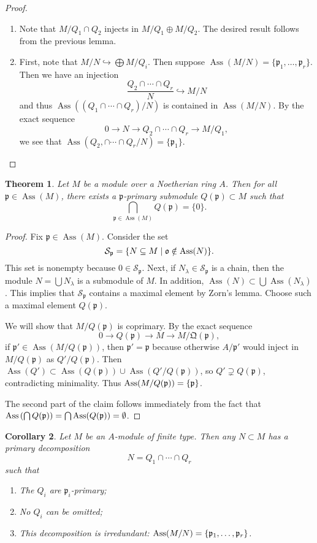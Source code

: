 \documentclass[leqno, openany]{memoir}
\newtheorem{thm}{Theorem}[section]
\newtheorem{cor}[thm]{Corollary}
\theoremstyle{definition}
\theoremstyle{remark}
\theoremstyle{plain}
\theoremstyle{definition}
\theoremstyle{remark}
\newcommand{\mc}[1]{\mathcal{#1}}
\newcommand{\mf}[1]{\mathfrak{#1}}
\DeclareMathOperator{\Ass}{Ass}
\begin{document}
\begin{proof} \begin{enumerate} \item Note that $M / Q_1 \cap Q_2$ injects in
    $M / Q_1 \oplus M / Q_2$. The desired result follows from the previous
    lemma.  \item First, note that $M/N \hookrightarrow \bigoplus M / Q_i$.
    Then suppose $\Ass(M/N) = \{ \mf{p}_1, \ldots, \mf{p}_r \}$. Then we have
    an injection \[ \frac{Q_2 \cap \cdots \cap Q_r}{N} \hookrightarrow M/N \]
    and thus $\Ass((Q_1 \cap  \cdots \cap Q_r)/N)$ is contained in $\Ass(M/N)$.
    By the exact sequence \[ 0 \to N \to Q_2 \cap \cdots \cap Q_r \to M/Q_1, \]
    we see that $\Ass(Q_2, \cap \cdots \cap Q_r / N) = \{ \mf{p}_1 \}$.
    \qedhere \end{enumerate} \end{proof}

\begin{thm} Let $M$ be a module over a Noetherian ring $A$. Then for all
    $\mf{p} \in \Ass(M)$, there exists a $\mf{p}$-primary submodule $Q(\mf{p})
    \subset M$ such that \[ \bigcap_{\mf{p} \in \Ass(M)} Q(\mf{p}) = \{0 \}. \]
\end{thm}

\begin{proof} Fix $\mf{p} \in \Ass(M)$. Consider the set \[ \mc{S}_{\mf{p}} =
\qty{ N \subseteq M \mid \mf{o} \notin \Ass(N) }. \] This set is nonempty
because $0 \in \mc{S}_{\mf{p}}$. Next, if $N_{\lambda} \in \mc{S}_{\mf{p}}$ is
a chain, then the module $N = \bigcup N_{\lambda}$ is a submodule of $M$. In
addition, $\Ass(N) \subset \bigcup \Ass(N_{\lambda})$. This implies that
$\mc{S}_{\mf{p}}$ contains a maximal element by Zorn's lemma. Choose such a
maximal element $Q(\mf{p})$.

    We will show that $M/Q(\mf{p})$ is coprimary. By the exact sequence \[ 0
    \to Q(\mf{p}) \to M \to M/\mf{Q}(\mf{p}), \] if $\mf{p}' \in
    \Ass(M/Q(\mf{p}))$, then $\mf{p}' = \mf{p}$ because otherwise $A/ \mf{p}'$
    would inject in $M / Q(\mf{p})$ as $Q'/Q(\mf{p})$. Then $\Ass(Q') \subset
    \Ass(Q(\mf{p})) \cup \Ass(Q' / Q(\mf{p}))$, so $Q' \supsetneq Q(\mf{p})$,
    contradicting minimality. Thus $\Ass(M / Q(\mf{p})) = \qty{\mf{p}}$. 

    The second part of the claim follows immediately from the fact that
$\Ass\qty(\bigcap Q(\mf{p})) = \bigcap \Ass(Q(\mf{p})) = \emptyset$.
\end{proof}

\begin{cor} Let $M$ be an $A$-module of finite type. Then any $N \subset M$ has
    a primary decomposition \[ N = Q_1 \cap \cdots \cap Q_r \] such that
    \begin{enumerate} \item The $Q_i$ are $\mf{p}_i$-primary; \item No $Q_i$
        can be omitted; \item This decomposition is irredundant: $\Ass(M/N) =
        \qty{\mf{p}_1, \ldots, \mf{p}_r}$.  \end{enumerate} \end{cor}
\end{document}
